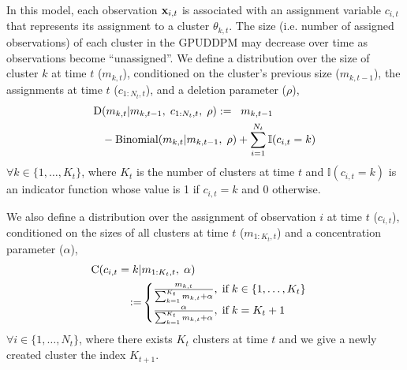 \documentclass[twocolumn, final]{svjour3}
\begin{document}
In this model, each observation $\bold{x}_{i,t}$ is associated with an assignment variable $c_{i,t}$ that represents its assignment to a cluster $\theta_{k,t}$. 
The size (i.e. number of assigned observations) of each cluster in the GPUDDPM may decrease over time as observations become ``unassigned''. We define a distribution over the size of cluster $k$ at time $t$ ($m_{k,t}$), conditioned on the cluster's previous size ($m_{k,t-1}$), the assignments at time $t$ ($c_{1:N_{t}, t}$), and a deletion parameter ($\rho$),
\begin{equation}
\begin{split}
\label{D_distro}
\text{D} &(m_{k,t} | m_{k,t-1}, \hspace{1mm} c_{1:N_{t}, t}, \hspace{1mm} \rho) := \hspace{2mm} m_{k,t-1} \\
&- \text{Binomial}( m_{k,t} | {m_{k,t-1}, \hspace{1mm} \rho}) + \sum_{i=1}^{N_{t}} \mathbb{I}(c_{i,t} = k)
\end{split}
\end{equation}
$\forall k \in \{1, \ldots, K_{t} \}$, where $K_{t}$ is the number of clusters at time $t$ and $\mathbb{I}(c_{i,t} = k)$ is an indicator function whose value is 1 if $c_{i,t} = k$ and 0 otherwise.

We also define a distribution over the assignment of observation $i$ at time $t$ ($c_{i,t}$), conditioned on the sizes of all clusters at time $t$ ($m_{1:K_{t},t}$) and a concentration parameter ($\alpha$),
\begin{equation}
\begin{split}
\label{C_distro}
\text{C} ( c_{i,t} = k | &m_{1:K_{t},t}, \hspace{1mm} \alpha)\\ :=
& \begin{cases}
\frac{m_{k,t}}{\sum_{k=1}^{K_{t}} m_{k,t} + \alpha}, \hspace{1mm} \text{if} \hspace{1mm} k \in \{ 1, \ldots, K_{t} \} \\
\frac{\alpha}{\sum_{k=1}^{K_{t}} m_{k,t} + \alpha}, \hspace{1mm} \text{if} \hspace{1mm} k = K_{t} + 1
\end{cases}
\end{split}
\end{equation}
$\forall i \in \{1, \ldots, N_{t} \}$, where there exists $K_{t}$ clusters at time $t$ and we give a newly created cluster the index $K_{t+1}$.
\end{document}
